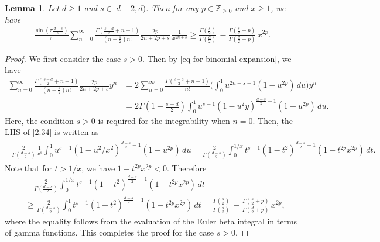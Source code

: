 \documentclass[10pt]{amsart}
\theoremstyle{plain}
\newtheorem{lem}[thm]{Lemma}
\theoremstyle{remark}
\numberwithin{equation}{section}
\begin{document}
\begin{lem}\label{Lem_hypergeometric inequal for power type potential}
Let $d \ge 1$ and $s \in [d-2,d)$. Then for any $p\in \mathbb{Z}_{ \ge 0 }$ and $x \ge 1$, we have 
\begin{align} \label{2.34}
 \frac{\sin(\pi\tfrac{d-s}{2})}{\pi} \sum_{n=0}^\infty \frac{  \Gamma( \frac{s-d}{2}+n+1 )  }{  (n+\frac{s}{2}) n! }   \frac{2p}{2n+2p+s}    \, \frac{1}{x^{2n+s}}  \ge     \frac{ \Gamma(\frac{s}{2})   }{ \Gamma(\frac{d}{2})  }  \,  -    \frac{ \Gamma(\frac{s}{2}+p)   }{ \Gamma(\frac{d}{2}+p)  } \,      x^{2p}.
\end{align}
\end{lem}
\begin{proof} 

We first consider the case $s >0$. Then by \eqref{eq for binomial expansion}, we have 
\begin{align*}
 \sum_{n=0}^\infty \frac{  \Gamma( \frac{s-d}{2}+n+1 )  }{  (n+\frac{s}{2}) n! }   \frac{2p}{2n+2p+s} y^{n} &= 2\sum_{n=0}^\infty \frac{  \Gamma( \frac{s-d}{2}+n+1 )  }{    n! }  \bigg(\int_0^1 u^{2n+s-1}(1-u^{2p})\,du \bigg)  y^n
\\
&= 2 \Gamma( 1+\tfrac{s-d}{2} ) \int_0^1 u^{s-1} (1-u^2y)^{ \frac{d-s}{2}-1 } (1-u^{2p})\,du .
\end{align*}
Here, the condition $s>0$ is required for the integrability when $n=0$.
Then, the LHS of \eqref{2.34} is written as 
\begin{align}
\begin{split}
 \frac{2}{ \Gamma( \frac{d-s}{2} ) } \frac{1}{x^s} \int_0^1 u^{s-1} (1-u^2/x^2)^{ \frac{d-s}{2}-1 } (1-u^{2p})\,du
= \frac{2}{ \Gamma( \frac{d-s}{2} ) }   \int_0^{1/x} t^{s-1} (1-t^2)^{ \frac{d-s}{2}-1 } (1-t^{2p}x^{2p})\,dt. 
\end{split}  
\end{align}
Note that for $t>1/x$, we have $1-t^{2p}x^{2p}<0$. Therefore 
\begin{align*}
&\quad \frac{2}{ \Gamma( \frac{d-s}{2} ) }   \int_0^{1/x} t^{s-1} (1-t^2)^{ \frac{d-s}{2}-1 } (1-t^{2p}x^{2p})\,dt 
\\
& \ge \frac{2}{ \Gamma( \frac{d-s}{2} ) }   \int_0^{1} t^{s-1} (1-t^2)^{ \frac{d-s}{2}-1 } (1-t^{2p}x^{2p})\,dt =   \frac{ \Gamma(\frac{s}{2})   }{ \Gamma(\frac{d}{2})  }  \,  -    \frac{ \Gamma(\frac{s}{2}+p)   }{ \Gamma(\frac{d}{2}+p)  } \,      x^{2p},
\end{align*}
where the equality follows from the evaluation of the Euler beta integral in terms of gamma functions.
This completes the proof for the case $s>0$. 


\end{proof}
\end{document}
